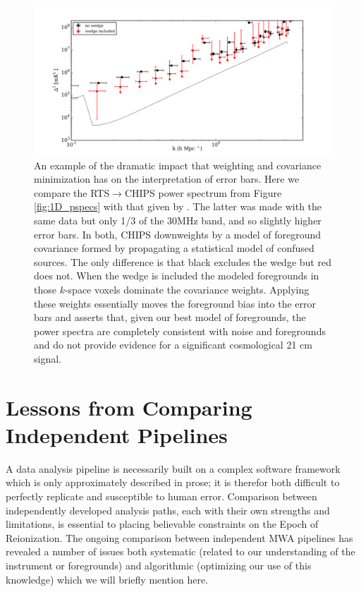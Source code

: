\documentclass[twolcolumn,iop]{emulateapj}
\def\chipscite{\cite{2016arXiv160102073T}}
\begin{document}
\begin{figure}[htbp]
\begin{center}
\includegraphics[width=\textwidth]{figures/MWA_PS_Compare/MWAPipeline_compare_1d_radial_chips_pub.png}
\caption{An example of the dramatic impact that weighting and covariance minimization has on the interpretation of error bars.  Here we compare the RTS$\to$CHIPS power spectrum from Figure \ref{fig:1D_pspecs} with that given by \chipscite{}. The latter was made with the same data but only 1/3 of the 30MHz band, and so slightly higher error bars.  In both, CHIPS downweights by a model of foreground covariance formed by propagating a statistical model of confused sources. The only difference is that black excludes the wedge but red does not. When the wedge is included the modeled foregrounds in those $k$-space voxels dominate the covariance weights. Applying these weights essentially moves the foreground bias into the error bars and asserts that, given our best model of foregrounds, the power spectra are completely consistent with noise and foregrounds and do not provide evidence for a significant cosmological 21 cm signal.}
\label{fig:CHIPS_compare}
\end{center}
\end{figure}

\section{Lessons from Comparing Independent Pipelines}
\label{sec:lessons}
          A data analysis pipeline is necessarily built on a complex software framework which is only approximately described in prose; it is therefor both difficult to perfectly replicate and susceptible to human error.  Comparison between independently developed analysis paths, each with their own strengths and limitations, is essential to placing believable constraints on the Epoch of Reionization. The ongoing comparison between independent MWA pipelines has revealed a number of issues both systematic (related to our understanding of the instrument or foregrounds) and algorithmic (optimizing our use of this knowledge) which we will briefly mention here.
      
\end{document}
